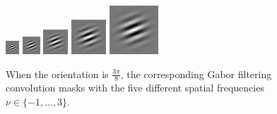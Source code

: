 \begin{figure}
\begin{center}
\includegraphics[scale=1.0]{ch4/figures/real-1.jpg}
\includegraphics[scale=1.0]{ch4/figures/real0.jpg}
\includegraphics[scale=1.0]{ch4/figures/real1.jpg}
\includegraphics[scale=1.0]{ch4/figures/real2.jpg}
\includegraphics[scale=1.0]{ch4/figures/real3.jpg}\\
\caption{When the orientation is $\frac{3\pi}{8}$, the corresponding Gabor filtering convolution masks with the five different spatial frequencies $\nu\in\{-1,\ldots,3\}$.} 
\end{center}
\label{fig:fivemasks}
\end{figure} 

